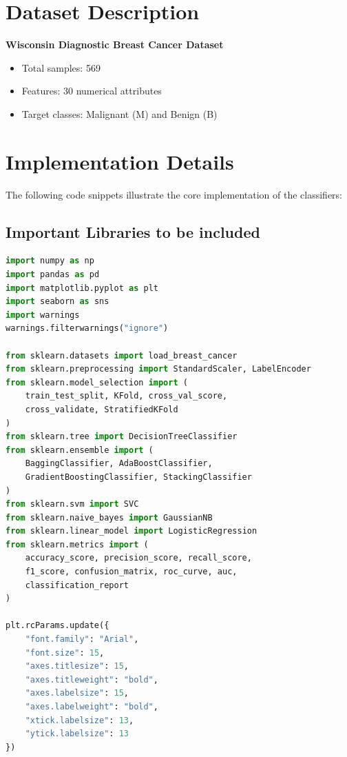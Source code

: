 \documentclass[11pt]{article}
\begin{document}
\section{Dataset Description}
\textbf{Wisconsin Diagnostic Breast Cancer Dataset}
\begin{itemize}
    \item Total samples: 569
    \item Features: 30 numerical attributes
    \item Target classes: Malignant (M) and Benign (B)
\end{itemize}

\section{Implementation Details}
The following code snippets illustrate the core implementation of the classifiers:

\subsection*{Important Libraries to be included}
\begin{lstlisting}[language=Python]
import numpy as np
import pandas as pd
import matplotlib.pyplot as plt
import seaborn as sns
import warnings
warnings.filterwarnings("ignore")
 
from sklearn.datasets import load_breast_cancer
from sklearn.preprocessing import StandardScaler, LabelEncoder
from sklearn.model_selection import (
    train_test_split, KFold, cross_val_score,
    cross_validate, StratifiedKFold
)
from sklearn.tree import DecisionTreeClassifier
from sklearn.ensemble import (
    BaggingClassifier, AdaBoostClassifier,
    GradientBoostingClassifier, StackingClassifier
)
from sklearn.svm import SVC
from sklearn.naive_bayes import GaussianNB
from sklearn.linear_model import LogisticRegression
from sklearn.metrics import (
    accuracy_score, precision_score, recall_score,
    f1_score, confusion_matrix, roc_curve, auc,
    classification_report
)

plt.rcParams.update({
    "font.family": "Arial",
    "font.size": 15,
    "axes.titlesize": 15,
    "axes.titleweight": "bold",
    "axes.labelsize": 15,
    "axes.labelweight": "bold",
    "xtick.labelsize": 13,
    "ytick.labelsize": 13
})
\end{lstlisting}
\end{document}
